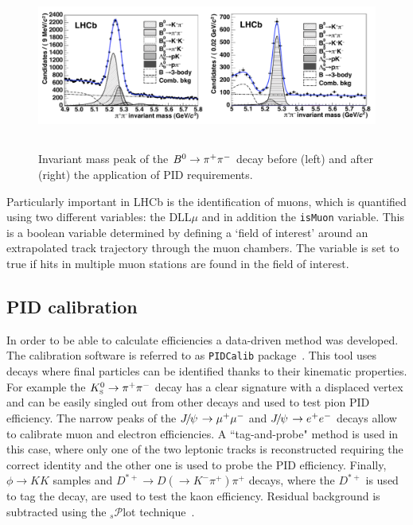 \begin{figure}[h!]
\centering
\includegraphics[width=1.\textwidth,height=5.5cm]{Detector/figs/pid_peaks.png}
\caption{Invariant mass peak of the $\Bz\to\pi^+\pi^-$ decay before (left) and
after (right) the application of PID requirements. }
\label{fig:pid_peaks}
\end{figure}
%
Particularly important in LHCb is the identification of muons, which is quantified using two different variables: the DLL$\mu$
and in addition the \verb!isMuon! variable. This is a boolean variable determined by defining a `field of interest' around 
an extrapolated track trajectory through the muon chambers. The variable is set to true if hits in multiple muon stations are found in the field of interest.

\subsection{PID calibration}
\label{sec:PID_calib}

In order to be able to calculate efficiencies a data-driven method was developed.
The calibration software is referred to as \verb!PIDCalib! package~\cite{Aaij:1978280}. 
This tool uses decays where final  particles can be identified thanks to their kinematic properties.
For example the $\KS\to\pi^+\pi^-$ decay has a clear signature with a displaced vertex
and can be easily singled out from other decays and used to test pion PID efficiency.
The narrow peaks of the $\jpsi\to\mumu$ and $\jpsi\to\ee$ decays allow to calibrate
muon and electron efficiencies. A ``tag-and-probe" method is used in this case, where only one 
of the two leptonic tracks is reconstructed requiring the correct identity and the other one
is used to probe the PID efficiency. Finally,  $\phi\to KK$ samples and 
$D^{*+}\to D(\to K^-\pi^+)\pi^+$ decays, where the $D^{*+}$ is used to tag the decay,
are used to test the kaon efficiency. Residual background is subtracted using
the $_s\mathcal{P}$lot technique~\cite{sPlot}.


